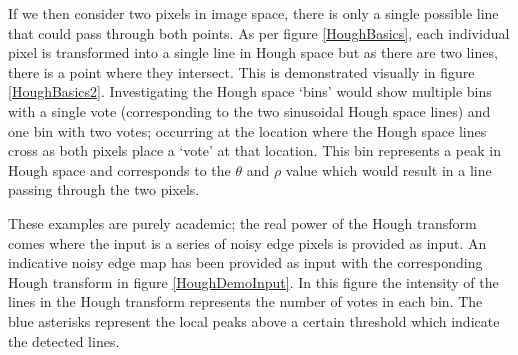 \documentclass{article}
\begin{document}
	If we then consider two pixels in image space, there is only a single possible line that could pass through both points. As per figure \ref{HoughBasics}, each individual pixel is transformed into a single line in Hough space but as there are two lines, there is a point where they intersect. This is demonstrated visually in figure \ref{HoughBasics2}. Investigating the Hough space `bins' would show multiple bins with a single vote (corresponding to the two sinusoidal Hough space lines) and one bin with two votes; occurring at the location where the Hough space lines cross as both pixels place a `vote' at that location. This bin represents a peak in Hough space and corresponds to the $\theta$ and $\rho$ value which would result in a line passing through the two pixels.
	
	


	
	
	These examples are purely academic; the real power of the Hough transform comes where the input is a series of noisy edge pixels is provided as input. An indicative noisy edge map has been provided as input with the corresponding Hough transform in figure \ref{HoughDemoInput}. In this figure the intensity of the lines in the Hough transform represents the number of votes in each bin. The blue asterisks represent the local peaks above a certain threshold which indicate the detected lines.
	
\end{document}
